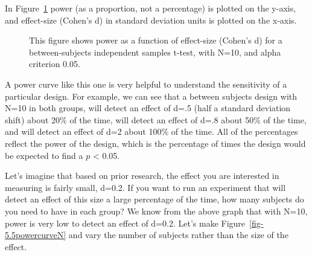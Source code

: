 \documentclass[
  letterpaper,
  DIV=11,
  numbers=noendperiod]{scrreprt}
\begin{document}
In Figure~\ref{fig-5.5powercurve} power (as a proportion, not a
percentage) is plotted on the y-axis, and effect-size (Cohen's d) in
standard deviation units is plotted on the x-axis.

\begin{figure}


\caption{\label{fig-5.5powercurve}This figure shows power as a function
of effect-size (Cohen's d) for a between-subjects independent samples
t-test, with N=10, and alpha criterion 0.05.}

\end{figure}%

A power curve like this one is very helpful to understand the
sensitivity of a particular design. For example, we can see that a
between subjects design with N=10 in both groups, will detect an effect
of d=.5 (half a standard deviation shift) about 20\% of the time, will
detect an effect of d=.8 about 50\% of the time, and will detect an
effect of d=2 about 100\% of the time. All of the percentages reflect
the power of the design, which is the percentage of times the design
would be expected to find a \(p\) \textless{} 0.05.

Let's imagine that based on prior research, the effect you are
interested in measuring is fairly small, d=0.2. If you want to run an
experiment that will detect an effect of this size a large percentage of
the time, how many subjects do you need to have in each group? We know
from the above graph that with N=10, power is very low to detect an
effect of d=0.2. Let's make Figure~\ref{fig-5.5powercurveN} and vary the
number of subjects rather than the size of the effect.
\end{document}

